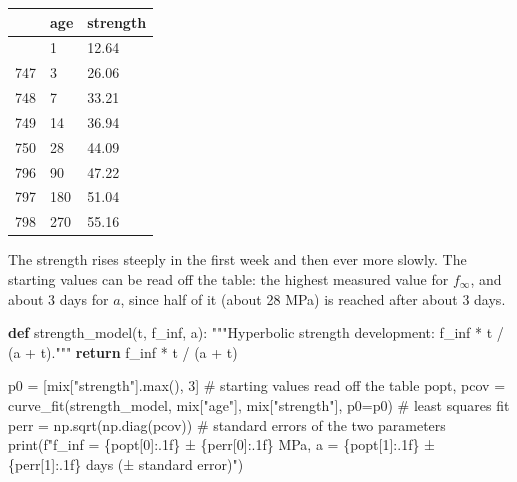 \documentclass[
  letterpaper,
  DIV=11,
  numbers=noendperiod]{scrreprt}
\newenvironment{Shaded}{\begin{snugshade}}{\end{snugshade}}
\newcommand{\BuiltInTok}[1]{\textcolor[rgb]{0.00,0.23,0.31}{#1}}
\newcommand{\CommentTok}[1]{\textcolor[rgb]{0.37,0.37,0.37}{#1}}
\newcommand{\ControlFlowTok}[1]{\textcolor[rgb]{0.00,0.23,0.31}{\textbf{#1}}}
\newcommand{\DecValTok}[1]{\textcolor[rgb]{0.68,0.00,0.00}{#1}}
\newcommand{\KeywordTok}[1]{\textcolor[rgb]{0.00,0.23,0.31}{\textbf{#1}}}
\newcommand{\NormalTok}[1]{\textcolor[rgb]{0.00,0.23,0.31}{#1}}
\newcommand{\OperatorTok}[1]{\textcolor[rgb]{0.37,0.37,0.37}{#1}}
\newcommand{\SpecialCharTok}[1]{\textcolor[rgb]{0.37,0.37,0.37}{#1}}
\newcommand{\SpecialStringTok}[1]{\textcolor[rgb]{0.13,0.47,0.30}{#1}}
\newcommand{\StringTok}[1]{\textcolor[rgb]{0.13,0.47,0.30}{#1}}
\begin{document}
\begin{longtable}[]{@{}lll@{}}
\toprule\noalign{}
& age & strength \\
\midrule\noalign{}
\endhead
\bottomrule\noalign{}
\endlastfoot
746 & 1 & 12.64 \\
747 & 3 & 26.06 \\
748 & 7 & 33.21 \\
749 & 14 & 36.94 \\
750 & 28 & 44.09 \\
796 & 90 & 47.22 \\
797 & 180 & 51.04 \\
798 & 270 & 55.16 \\
\end{longtable}

The strength rises steeply in the first week and then ever more slowly.
The starting values can be read off the table: the highest measured
value for \(f_\infty\), and about 3 days for \(a\), since half of it
(about 28 MPa) is reached after about 3 days.

\begin{Shaded}
\begin{Highlighting}[]
\KeywordTok{def}\NormalTok{ strength\_model(t, f\_inf, a):}
    \CommentTok{"""Hyperbolic strength development: f\_inf * t / (a + t)."""}
    \ControlFlowTok{return}\NormalTok{ f\_inf }\OperatorTok{*}\NormalTok{ t }\OperatorTok{/}\NormalTok{ (a }\OperatorTok{+}\NormalTok{ t)}

\NormalTok{p0 }\OperatorTok{=}\NormalTok{ [mix[}\StringTok{"strength"}\NormalTok{].}\BuiltInTok{max}\NormalTok{(), }\DecValTok{3}\NormalTok{]                          }\CommentTok{\# starting values read off the table}
\NormalTok{popt, pcov }\OperatorTok{=}\NormalTok{ curve\_fit(strength\_model, mix[}\StringTok{"age"}\NormalTok{], mix[}\StringTok{"strength"}\NormalTok{], p0}\OperatorTok{=}\NormalTok{p0)  }\CommentTok{\# least squares fit}
\NormalTok{perr }\OperatorTok{=}\NormalTok{ np.sqrt(np.diag(pcov))                            }\CommentTok{\# standard errors of the two parameters}
\BuiltInTok{print}\NormalTok{(}\SpecialStringTok{f"f\_inf = }\SpecialCharTok{\{}\NormalTok{popt[}\DecValTok{0}\NormalTok{]}\SpecialCharTok{:.1f\}}\SpecialStringTok{ ± }\SpecialCharTok{\{}\NormalTok{perr[}\DecValTok{0}\NormalTok{]}\SpecialCharTok{:.1f\}}\SpecialStringTok{ MPa,  a = }\SpecialCharTok{\{}\NormalTok{popt[}\DecValTok{1}\NormalTok{]}\SpecialCharTok{:.1f\}}\SpecialStringTok{ ± }\SpecialCharTok{\{}\NormalTok{perr[}\DecValTok{1}\NormalTok{]}\SpecialCharTok{:.1f\}}\SpecialStringTok{ days  (± standard error)"}\NormalTok{)}
\end{Highlighting}
\end{Shaded}
\end{document}
